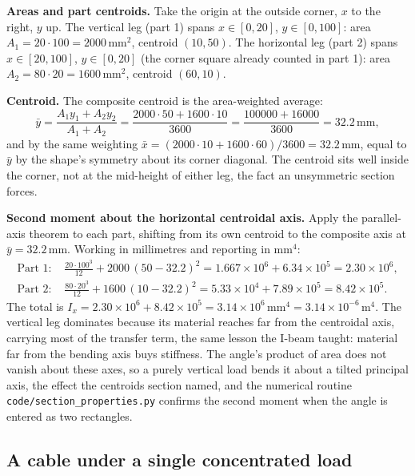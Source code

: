 \textbf{Areas and part centroids.} Take the origin at the outside corner,
$x$ to the right, $y$ up. The vertical leg (part 1) spans $x\in[0,20]$,
$y\in[0,100]$: area $A_1 = 20\cdot 100 = 2000\,\si{\milli\meter\squared}$,
centroid $(10, 50)$. The horizontal leg (part 2) spans $x\in[20,100]$,
$y\in[0,20]$ (the corner square already counted in part 1): area
$A_2 = 80\cdot 20 = 1600\,\si{\milli\meter\squared}$, centroid $(60, 10)$.

\textbf{Centroid.} The composite centroid is the area-weighted average:
\[
\bar{y} = \frac{A_1 y_1 + A_2 y_2}{A_1 + A_2}
= \frac{2000\cdot 50 + 1600\cdot 10}{3600}
= \frac{100000 + 16000}{3600} = 32.2\,\si{\milli\meter},
\]
and by the same weighting $\bar{x} = (2000\cdot 10 + 1600\cdot 60)/3600 =
32.2\,\si{\milli\meter}$, equal to $\bar{y}$ by the shape's symmetry about
its corner diagonal. The centroid sits well inside the corner, not at the
mid-height of either leg, the fact an unsymmetric section forces.

\textbf{Second moment about the horizontal centroidal axis.} Apply the
parallel-axis theorem to each part, shifting from its own centroid to the
composite axis at $\bar{y} = 32.2\,\si{\milli\meter}$. Working in
millimetres and reporting in $\si{\milli\meter\tothe{4}}$:
\begin{align*}
\text{Part 1: } &\frac{20\cdot 100^3}{12} + 2000\,(50 - 32.2)^2
= 1.667\times 10^6 + 6.34\times 10^5 = 2.30\times 10^6,\\
\text{Part 2: } &\frac{80\cdot 20^3}{12} + 1600\,(10 - 32.2)^2
= 5.33\times 10^4 + 7.89\times 10^5 = 8.42\times 10^5.
\end{align*}
The total is $I_x = 2.30\times 10^6 + 8.42\times 10^5 =
3.14\times 10^6\,\si{\milli\meter\tothe{4}} =
3.14\times 10^{-6}\,\si{\meter\tothe{4}}$. The vertical leg dominates
because its material reaches far from the centroidal axis, carrying most of
the transfer term, the same lesson the I-beam taught: material far from the
bending axis buys stiffness. The angle's product of area does not vanish
about these axes, so a purely vertical load bends it about a tilted
principal axis, the effect the centroids section named, and the numerical
routine \texttt{code/section\_properties.py} confirms the second moment when
the angle is entered as two rectangles.

\subsection{A cable under a single concentrated load}


